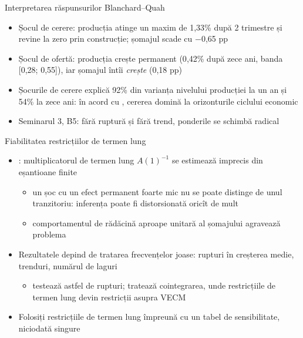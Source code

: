\begin{frame}{Interpretarea răspunsurilor Blanchard--Quah}
\itemsize{\small}
\begin{itemize}
    \item Șocul de cerere: producția atinge un maxim de 1{,}33\% după 2 trimestre și revine la zero prin construcție; șomajul scade cu \ensuremath{-}0{,}65 pp
    \item Șocul de ofertă: producția crește permanent (0{,}42\% după zece ani, banda [0{,}28; 0{,}55]), iar șomajul întîi \emph{crește} (0{,}18 pp)
    \item Șocurile de cerere explică 92\% din varianța nivelului producției la un an și 54\% la zece ani: în acord cu , cererea domină la orizonturile ciclului economic
    \item Seminarul 3, B5: fără ruptură și fără trend, ponderile se schimbă radical
\end{itemize}
\end{frame}

\begin{frame}{Fiabilitatea restricțiilor de termen lung}
\itemsize{\small}
\begin{itemize}
    \item {}: multiplicatorul de termen lung $A(1)^{-1}$ se estimează imprecis din eșantioane finite
    \begin{itemize}
        \item un șoc cu un efect permanent foarte mic nu se poate distinge de unul tranzitoriu: inferența poate fi distorsionată oricît de mult
        \item comportamentul de rădăcină aproape unitară al șomajului agravează problema
    \end{itemize}
    \item Rezultatele depind de tratarea frecvențelor joase: rupturi în creșterea medie, trenduri, numărul de laguri
    \begin{itemize}
        \item {} testează astfel de rupturi;  tratează cointegrarea, unde restricțiile de termen lung devin restricții asupra VECM
    \end{itemize}
    \item Folosiți restricțiile de termen lung împreună cu un tabel de sensibilitate, niciodată singure
\end{itemize}
\end{frame}

